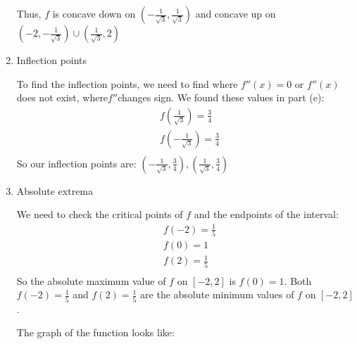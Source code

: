 \documentclass[nooutcomes]{ximera}
\begin{document}
\begin{problem}
\begin{enumerate}
\begin{freeResponse}
		
		
		Thus, $f$ is concave down on $\left( - \frac{1}{\sqrt{3}}, \frac{1}{\sqrt{3}} \right)$ and concave up on \\ 
		$\left( -2, - \frac{1}{\sqrt{3}} \right) \cup \left( \frac{1}{\sqrt{3}}, 2 \right)$
		\end{freeResponse}
		
	\item  Inflection points
	
		\begin{freeResponse}
		To find the inflection points, we need to find where $f''(x)=0$ or $f''(x)$ does not exist,  where$f''$changes sign.  We found these values in part (e):
		\begin{align*}
 		 & f\left( \frac{1}{\sqrt{3}} \right)=\frac{3}{4} \\ 
 		& f\left( -\frac{1}{\sqrt{3}} \right)=\frac{3}{4} \\ 
		\end{align*}  
		So our inflection points are: $\left( -\frac{1}{\sqrt{3}},\frac{3}{4} \right),\left( \frac{1}{\sqrt{3}},\frac{3}{4} \right)$
		\end{freeResponse}
		
	\item  Absolute extrema
	
		\begin{freeResponse}
		We need to check the critical points of $f$ and the endpoints of the interval:
		\begin{align*}
  		& f(-2)=\frac{1}{5} \\ 
 		& f(0)=1 \\ 
 		& f(2)=\frac{1}{5} \\ 
		\end{align*}
		So the absolute maximum value of $f$ on $[-2,2]$ is $f(0)=1$.  Both $f(-2)=\frac{1}{5}$ and $f(2)=\frac{1}{5}$ are the absolute minimum values of $f$ on $[-2,2]$.
		
		The graph of the function looks like:
		
\begin{center}
\begin{image}
\end{image}
\end{center}
\end{freeResponse}
\end{enumerate}
\end{problem}
\end{document}
